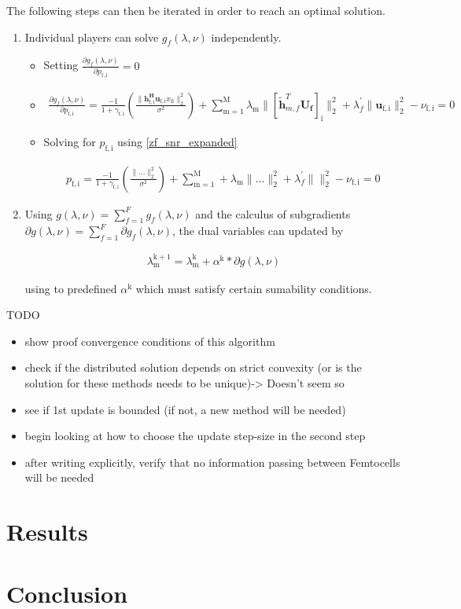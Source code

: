\documentclass[12pt,a4paper]{report}
\begin{document}
The following steps can then be iterated in order to reach an optimal solution. 
\begin{enumerate}
\item 
Individual players can solve $ g_f(\lambda,\nu) $ independently.
\begin{itemize}
\item Setting $\frac{\partial g_f(\lambda,\nu)}{\partial p_{\mathrm{f,i}}} = 0$ 
\item 
\begin{gather}
 \frac{\partial g_f(\lambda,\nu)}{\partial p_{\mathrm{f,i}}} =
  \frac{-1}{1+\gamma_{\mathrm{f,i}}}(\frac{\|\mathbf{h^H_{\mathrm{f,i}}
	u_{\mathrm{f,i}}}x_{\mathrm{fi}}\|^2_2}{\sigma^2})+
\sum_{\mathrm{m=1}}^{\mathrm{M}}\lambda_{\mathrm{m}}\|[\mathbf{\tilde{h}}_{m,f}^T \mathbf{U_f}]_{\mathrm{i}}\|^2_2 +
\lambda^{\prime}_{f} \|\mathbf{u}_{\mathrm{f,i}}\|^2_2
-\nu_{\mathrm{f,i}} = 0
\end{gather}
\item 
Solving for $p_{\mathrm{f,i}}$ using \eqref{zf_snr_expanded}

\begin{gather}
p_{\mathrm{f,i}} =
  \frac{-1}{1+\gamma_{\mathrm{f,i}}}(\frac{\| ...\|^2_2}{\sigma^2})+
\sum_{\mathrm{m=1}}^{\mathrm{M}}+\lambda_{\mathrm{m}}\| ...\|^2_2 +
\lambda^{\prime}_{f} \|\|^2_2
-\nu_{\mathrm{f,i}} = 0
\end{gather}

\end{itemize}
\item 
Using $g(\lambda,\nu) = \sum_{f=1}^{F}g_f(\lambda,\nu)$ and the calculus of subgradients $\partial g(\lambda,\nu) = \sum_{f=1}^{F} \partial g_f(\lambda,\nu)$, the dual variables can updated by 

\begin{gather}
\lambda_{\mathrm{m}}^{\mathrm{k+1}} = 
\lambda_{\mathrm{m}}^{\mathrm{k}}
+
\alpha^{\mathrm{k}}*
\partial g(\lambda,\nu)
\end{gather}

using to predefined $\alpha^{\mathrm{k}}$ which must satisfy certain sumability conditions.



\end{enumerate} 

TODO 
\begin{itemize}
\item show proof convergence conditions of this algorithm
\item check if the distributed solution depends on strict convexity (or is  the solution for these methods needs to be unique)-> Doesn't seem so
\item see if 1st update is bounded (if not, a new method will be needed)
\item begin looking at how to choose the update step-size in the second step
\item after writing explicitly, verify that no information passing between Femtocells will be needed 
\end{itemize}

\chapter{Results}

\chapter{Conclusion}

\newpage

\end{document}
